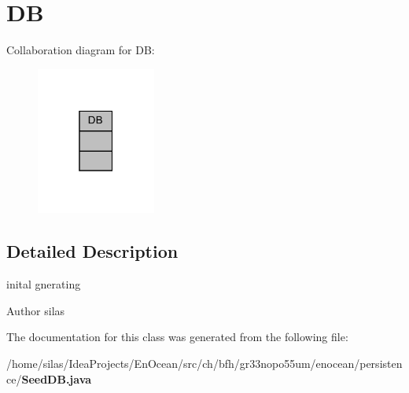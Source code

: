 \section{DB}
\label{classDB}


Collaboration diagram for DB\+:\nopagebreak
\begin{figure}[H]
\begin{center}
\leavevmode
\includegraphics[width=111pt]{d7/d82/classDB__coll__graph}
\end{center}
\end{figure}


\subsection{Detailed Description}
inital gnerating

\begin{DoxyAuthor}{Author}
silas 
\end{DoxyAuthor}


The documentation for this class was generated from the following file\+:\begin{DoxyCompactItemize}
\item 
/home/silas/\+Idea\+Projects/\+En\+Ocean/src/ch/bfh/gr33nopo55um/enocean/persistence/{\bf Seed\+D\+B.\+java}\end{DoxyCompactItemize}

